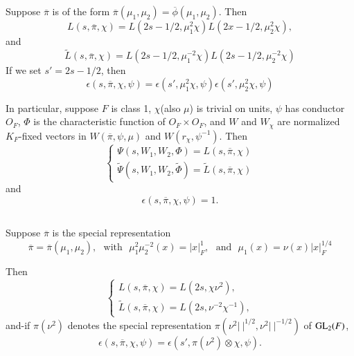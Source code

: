 \subsection{}\label{art1-sec6.2}
Suppose $\overline{\pi}$ is of the form $\overline{\pi}(\mu_{1},\mu_{2})=\overline{\phi}(\mu_{1},\mu_{2})$. Then
$$
L(s,\overline{\pi},\chi)=L(2s-1/2,\mu^{2}_{1}\chi)L(2x-1/2,\mu^{2}_{2}\chi),
$$
and
\setcounter{equation}{0}
\begin{equation}
\widetilde{L}(s,\overline{\pi},\chi)=L(2s-1/2,\mu^{-2}_{1}\chi)L(2s-1/2,\mu^{-2}_{2}\chi)\label{art1-eq6.2.1}
\end{equation}
If we set $s'=2s-1/2$, then
\begin{equation}
\epsilon(s,\overline{\pi},\chi,\psi)=\epsilon(s',\mu^{2}_{1}\chi,\psi)\epsilon(s',\mu^{2}_{2}\chi,\psi)\label{art1-eq6.2.2}
\end{equation}

In particular, suppose $F$ is class 1, $\chi$(also $\mu$) is trivial on units, $\psi$ has conductor $O_{F}$, $\Phi$ is the characteristic function of $O_{F}\times O_{F}$, and $W$ and $W_{\chi}$ are normalized $K_{F}$-fixed vectors in $W(\overline{\pi},\psi,\mu)$ and $W(r_{\chi},\psi^{-1})$. Then
\begin{equation}
\begin{cases}
\Psi(s,W_{1},W_{2},\Phi)=L(s,\overline{\pi},\chi)\\
\widetilde{\Psi}(s,W_{1},W_{2},\widetilde{\Phi})=\widetilde{L}(s,\overline{\pi},\chi)
\end{cases}\label{art1-eq6.2.3}
\end{equation}
and
$$
\epsilon(s,\overline{\pi},\chi,\psi)=1.
$$

\subsection{}\label{art1-sec6.3}
Suppose $\overline{\pi}$ is the special representation
$$
\overline{\pi}=\overline{\pi}(\mu_{1},\mu_{2}),\text{~ with~ }\mu^{2}_{1}\mu^{-2}_{2}(x)=|x|^{1}_{F},\text{~ and~ } \mu_{1}(x)=\nu(x)|x|^{1/4}_{F}
$$

Then
$$
\begin{cases}
L(s,\overline{\pi},\chi)=L(2s,\chi\nu^{2}),\\
\widetilde{L}(s,\overline{\pi},\chi)=L(2s,\nu^{-2}\chi^{-1}),
\end{cases}
$$
and-if $\pi(\nu^{2})$ denotes the special representation $\pi(\nu^{2}|~|^{1/2},\nu^{2}|~|^{-1/2})$ of $\mathrm{GL}_{2}(F)$,
$$
\epsilon(s,\overline{\pi},\chi,\psi)=\epsilon(s',\pi(\nu^{2})\otimes \chi,\psi).
$$

